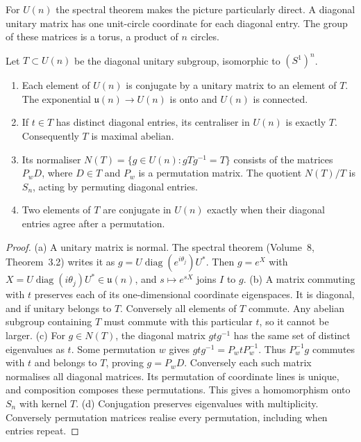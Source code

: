 For $U(n)$ the spectral theorem makes the picture particularly direct.
A diagonal unitary matrix has one unit-circle coordinate for each diagonal
entry. The group of these matrices is a torus, a product of $n$ circles.

\begin{theorem}\label{thm:torus}
Let $T\subset U(n)$ be the diagonal unitary subgroup, isomorphic to
$(S^1)^n$.
\begin{enumerate}
\item[(a)] Each element of $U(n)$ is conjugate by a unitary matrix to an
element of $T$. The exponential $\mathfrak u(n)\to U(n)$ is onto and
$U(n)$ is connected.
\item[(b)] If $t\in T$ has distinct diagonal entries, its centraliser in
$U(n)$ is exactly $T$. Consequently $T$ is maximal abelian.
\item[(c)] Its normaliser $N(T)=\{g\in U(n):gTg^{-1}=T\}$ consists
of the matrices $P_wD$, where $D\in T$ and $P_w$ is a permutation
matrix. The quotient $N(T)/T$ is $S_n$, acting by permuting diagonal entries.
\item[(d)] Two elements of $T$ are conjugate in $U(n)$ exactly when their
diagonal entries agree after a permutation.
\end{enumerate}
\end{theorem}
\begin{proof}
(a) A unitary matrix is normal. The spectral theorem
(Volume~8, Theorem~3.2) writes it as
$g=U\operatorname{diag}(e^{i\theta_j})U^*$.
Then $g=e^X$ with $X=U\operatorname{diag}(i\theta_j)U^*\in\mathfrak u(n)$,
and $s\mapsto e^{sX}$ joins $I$ to $g$.
(b) A matrix commuting with $t$ preserves each of its one-dimensional
coordinate eigenspaces. It is diagonal, and if unitary belongs to $T$.
Conversely all elements of $T$ commute. Any abelian subgroup containing
$T$ must commute with this particular $t$, so it cannot be larger.
(c) For $g\in N(T)$, the diagonal matrix $gtg^{-1}$ has the same
set of distinct eigenvalues as $t$. Some permutation $w$ gives
$gtg^{-1}=P_wtP_w^{-1}$. Thus $P_w^{-1}g$ commutes with $t$
and belongs to $T$, proving $g=P_wD$.
Conversely each such matrix normalises all diagonal matrices.
Its permutation of coordinate lines is unique, and composition composes
these permutations. This gives a homomorphism onto $S_n$ with kernel $T$.
(d) Conjugation preserves eigenvalues with multiplicity. Conversely
permutation matrices realise every permutation, including when entries repeat.
\end{proof}

